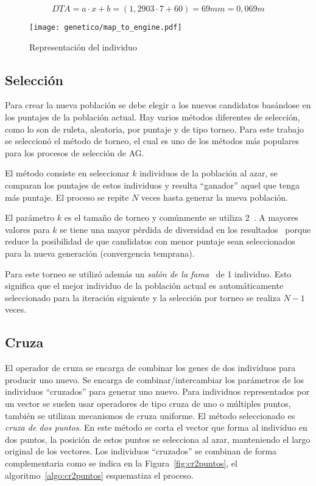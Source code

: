 \begin{equation*}
  DTA = a\cdot x + b = (1,2903\cdot 7 + 60) = 69 mm = 0,069 m
\end{equation*}


\begin{figure}[h!]
  \centering
  \texttt{[image: genetico/map\_to\_engine.pdf]}
  \caption{Representación del individuo}\label{fig:pop_bit}
\end{figure}


\subsection{Selección}

Para crear la nueva población se debe elegir a los nuevos candidatos basándose
en los puntajes de la población actual.
%
Hay varios métodos diferentes de selección, como lo son de ruleta, aleatoria,
por puntaje y de tipo torneo.
%
Para este trabajo se seleccionó el método de torneo, el cual es uno de los
métodos más populares para los procesos de selección de AG.

El método consiste en seleccionar $k$ individuos de la población al azar, se
comparan los puntajes de estos individuos y resulta ``ganador'' aquel que tenga
más puntaje.
%
El proceso se repite $N$ veces hasta generar la nueva población.

El parámetro $k$ es el tamaño de torneo y comúnmente se utiliza
2~\parencite{oladele}.
%
A mayores valores para $k$ se tiene una mayor pérdida de diversidad en los
resultados~\parencite{blickle} porque reduce la posibilidad de que candidatos con
menor puntaje sean seleccionados para la nueva generación (convergencia
temprana).

Para este torneo se utilizó además un \emph{salón de la
  fama}~\parencite{wirsansky} de 1 individuo.
%
Esto significa que el mejor individuo de la población actual es automáticamente
seleccionado para la iteración siguiente y la selección por torneo se realiza
$N-1$ veces.

\subsection{Cruza}
%
El operador de cruza se encarga de combinar los genes  de dos individuos para
producir uno nuevo.
%
Se encarga de combinar/intercambiar los parámetros de los individuos
``cruzados'' para generar uno nuevo.
%
Para individuos representados por un vector se suelen usar operadores de tipo
cruza de uno o múltiples puntos, también se utilizan mecanismos de cruza
uniforme.
%
El método seleccionado es \emph{cruza de dos puntos}.
%
En este método se corta el vector que forma al individuo en dos puntos, la
posición de estos puntos se selecciona al azar, manteniendo el largo original de
los vectores.
%
Los individuos ``cruzados'' se combinan de forma complementaria como se indica
en la Figura~\ref{fig:cr2puntos}, el algoritmo~\ref{algo:cr2puntos} esquematiza
el proceso.


